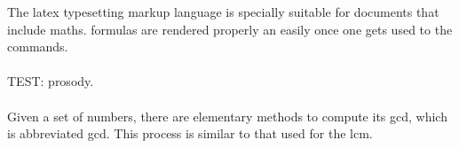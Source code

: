 \documentclass{article}
\begin{document}
The \Gls{latex} typesetting markup language is specially suitable 
for documents that include \gls{maths}. \Glspl{formula} are 
rendered properly an easily once one gets used to the commands.
\\ \\
TEST: \Gls{prosody}.
\\ \\
Given a set of numbers, there are elementary methods to compute 
its \acrlong{gcd}, which is abbreviated \acrshort{gcd}. This 
process is similar to that used for the \acrfull{lcm}.

\clearpage

\printglossary[type=\acronymtype]

\printglossary
\end{document}

